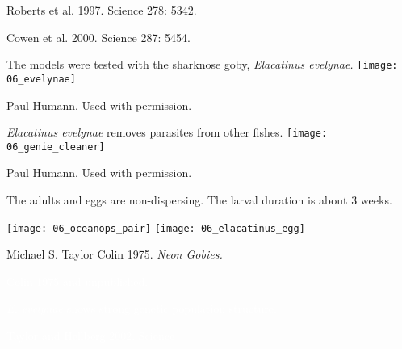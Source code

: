\documentclass[t]{beamer}
\begin{document}
{
\begin{frame}[b]

\hfill \tiny Roberts et al. 1997. Science 278: 5342.

\end{frame}
}
%
{
\begin{frame}[b]

\tiny Cowen et al. 2000. Science 287: 5454.

\end{frame}
}
%
\begin{frame}[t]{The models were tested with the sharknose goby, \textit{Elacatinus evelynae.}}
	\centering
	\texttt{[image: 06\_evelynae]}
	
	\vfilll
	
	\hfill \tiny \textcopyright Paul Humann. Used with permission.
\end{frame}
%
\begin{frame}[t]{\textit{Elacatinus evelynae} removes parasites from other fishes.}
	\centering
	\texttt{[image: 06\_genie\_cleaner]}
	
	\vfilll
	
	\hfill \tiny \textcopyright Paul Humann. Used with permission.
\end{frame}
%
\begin{frame}[t]{The adults and eggs are non-dispersing. The larval duration is about 3 weeks.}
		
	\texttt{[image: 06\_oceanops\_pair]}\hfill
	\texttt{[image: 06\_elacatinus\_egg]}
	
	\vfilll
	
	\tiny Michael S. Taylor \hfill Colin 1975. \textit{Neon Gobies.}
\end{frame}
%
{
\begin{frame}[b]

\tiny \textcolor{white}{Colin 1975 and unpublished.}

\end{frame}
}
%
{
\begin{frame}[b]{\textcolor{white}{\textit{E. evelynae} shows strong genetic population structure.}}

\hfill \tiny \textcolor{white}{Taylor and Hellberg 2002. Science }

\end{frame}
}
\end{document}
